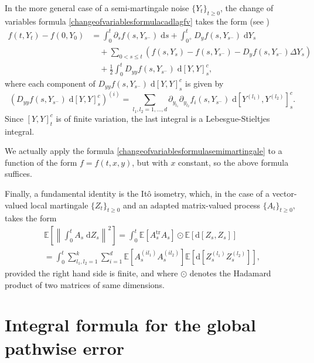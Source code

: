 \documentclass[reqno,12pt]{amsart}
\theoremstyle{plain} %
\theoremstyle{definition} %
\newcommand{\tr}{{\operatorname{tr}}}
\begin{document}
In the more general case of a semi-martingale noise $\{Y_t\}_{t\geq 0}$, the change of variables formula \cref{changeofvariablesformulacadlagfv} takes the form (see \cite[Theorems II.32 and II.33]{Protter2005})
\begin{equation}
    \label{changeofvariablesformulasemimartingale}
    \begin{aligned}
        f(t, Y_t) - f(0, Y_0) & = \int_0^t \partial_s f(s, Y_{s^-})\;\mathrm{d}s + \int_{0^+}^t D_y f(s, Y_{s^-}) \;\mathrm{d}Y_s \\
        & \quad + \sum_{0 < s \leq t} \left( f(s, Y_s) - f(s, Y_{s^{-}}) - D_y f(s, Y_{s^-})\Delta Y_s\right) \\
        & \quad + \frac{1}{2}\int_0^t D_{yy}f(s, Y_{s^-})\;\mathrm{d}[Y, Y]_s^c,
    \end{aligned}
\end{equation}
where each component of $D_{yy}f(s, Y_{s^-})\;\mathrm{d}[Y, Y]_s^c$ is given by
\[ \left(D_{yy}f(s, Y_{s^-})\;\mathrm{d}[Y, Y]_s^c\right)^{(i)} = \sum_{l_1, l_2 = 1, \ldots, d} \partial_{y_{l_1}}\partial_{y_{l_2}} f_i(s, Y_{s^-})\;\mathrm{d}[Y^{(l_1)}, Y^{(l_2)}]_s^c.
\]
Since $[Y, Y]_t^c$ is of finite variation, the last integral is a Lebesgue-Stieltjes integral.

We actually apply the formula \cref{changeofvariablesformulasemimartingale} to a function of the form $f=f(t, x, y)$, but with $x$ constant, so the above formula suffices.

Finally, a fundamental identity is the It\^o isometry, which, in the case of a vector-valued local martingale $\{Z_t\}_{t\geq 0}$ and an adapted matrix-valued process $\{A_t\}_{t\geq 0},$ takes the form
\begin{multline*}
    \mathbb{E}\left[\left\|\int_0^t A_s \;\mathrm{d}Z_s\right\|^2\right] = \int_0^t \mathbb{E}[A_s^\tr A_s] \odot \mathbb{E}[\mathrm{d}[Z_s, Z_s]] \\ = \int_0^t \sum_{l_1, l_2 = 1}^k \sum_{i=1}^d\mathbb{E}[A_s^{(il_1)}A_s^{(il_2)}]\mathbb{E}[\mathrm{d}[Z_s^{(l_1)}Z_s^{(l_2)}]],
\end{multline*}
provided the right hand side is finite, and where $\odot$ denotes the Hadamard product of two matrices of same dimensions.

\section{Integral formula for the global pathwise error}
\end{document}
